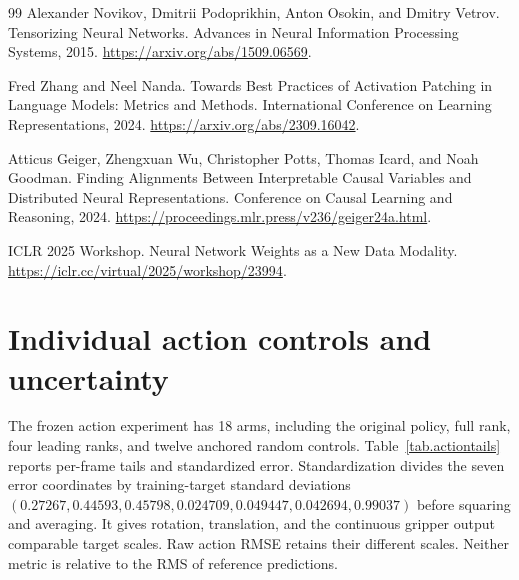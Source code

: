 \documentclass{article}
\begin{document}
\begin{thebibliography}{99}
Alexander Novikov, Dmitrii Podoprikhin, Anton Osokin, and Dmitry Vetrov.
\newblock Tensorizing Neural Networks.
\newblock Advances in Neural Information Processing Systems, 2015.
\newblock \url{https://arxiv.org/abs/1509.06569}.

Fred Zhang and Neel Nanda.
\newblock Towards Best Practices of Activation Patching in Language Models: Metrics and Methods.
\newblock International Conference on Learning Representations, 2024.
\newblock \url{https://arxiv.org/abs/2309.16042}.

Atticus Geiger, Zhengxuan Wu, Christopher Potts, Thomas Icard, and Noah Goodman.
\newblock Finding Alignments Between Interpretable Causal Variables and Distributed Neural Representations.
\newblock Conference on Causal Learning and Reasoning, 2024.
\newblock \url{https://proceedings.mlr.press/v236/geiger24a.html}.

ICLR 2025 Workshop.
\newblock Neural Network Weights as a New Data Modality.
\newblock \url{https://iclr.cc/virtual/2025/workshop/23994}.
\end{thebibliography}

\clearpage
\appendix
\section{Individual action controls and uncertainty}
\label{app.actions}

The frozen action experiment has 18 arms, including the original policy, full rank, four leading ranks, and twelve anchored random controls. Table~\ref{tab.actiontails} reports per-frame tails and standardized error. Standardization divides the seven error coordinates by training-target standard deviations $(0.27267,0.44593,0.45798,0.024709,0.049447,0.042694,0.99037)$ before squaring and averaging. It gives rotation, translation, and the continuous gripper output comparable target scales. Raw action RMSE retains their different scales. Neither metric is relative to the RMS of reference predictions.
\end{document}
